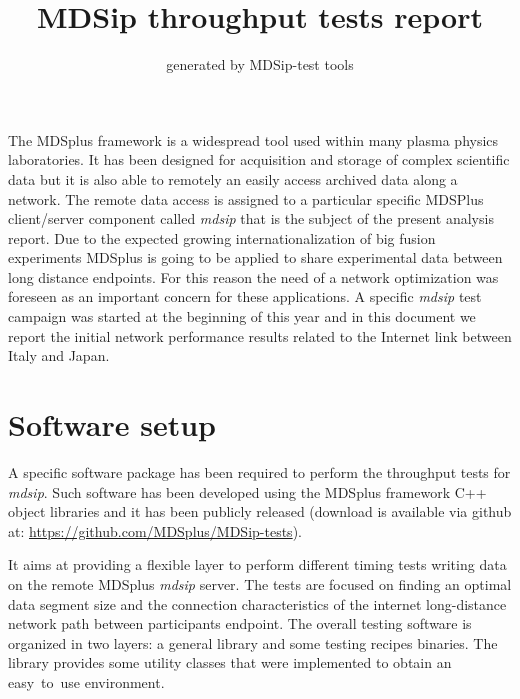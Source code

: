 \documentclass[10pt,a4paper]{article}
\author{generated by MDSip-test tools}
\title{MDSip throughput tests report}
\begin{document}
\maketitle

The MDSplus framework is a widespread tool used within many plasma physics laboratories.
It has been designed for acquisition and storage of complex scientific data but it is also able to remotely an easily access archived data along a network.
The remote data access is assigned to a particular specific MDSPlus  client/server component called \emph{mdsip} that is the subject of the present analysis report.
Due to the expected growing internationalization of big fusion experiments MDSplus is going to be applied to share experimental data between long distance endpoints.
For this reason the need of a network optimization was foreseen as an important concern for these applications.
A specific \emph{mdsip} test campaign was started at the beginning of this year and in this document we report the initial network performance results related to the Internet link between Italy and Japan.

\section{Software setup}

A specific software package has been required to perform the throughput tests for \emph{mdsip}.
Such software has been developed using the MDSplus framework C++ object libraries and it has been publicly released (download is available via github at: \url{https://github.com/MDSplus/MDSip-tests}).

It aims at providing a flexible layer to perform different timing tests writing data on the remote MDSplus \emph{mdsip} server. 
The tests are focused on finding an optimal data segment size and the connection characteristics of the internet long-distance network path between participants endpoint.
The overall testing software is organized in two layers: a general library and some testing recipes binaries. 
The library provides some utility classes that were implemented to obtain an easy~to~use environment.  

\end{document}
